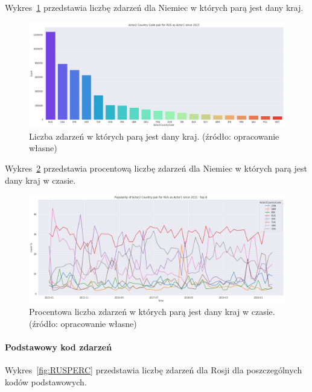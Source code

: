 \documentclass[11pt]{report}
\begin{document}
    Wykres~\ref{fig:RUSpair} przedstawia liczbę zdarzeń dla Niemiec w których parą jest dany kraj.

    \begin{figure}[!htp]
        \centering
        \includegraphics[width=1 \textwidth]{fig/RUS/RUSactor2Pair.png}
        \caption{Liczba zdarzeń w których parą jest dany kraj. (źródło: opracowanie własne)}
        \label{fig:RUSpair}
    \end{figure}


    Wykres~\ref{fig:RUSpairPerc} przedstawia procentową liczbę zdarzeń dla Niemiec w których parą jest dany kraj w czasie.
    \begin{figure}[!htp]
        \centering
        \includegraphics[width=1 \textwidth]{fig/RUS/RUSactor2PairPercinTIME.png}
        \caption{Procentowa liczba zdarzeń w których parą jest dany kraj w czasie. (źródło: opracowanie własne)}
        \label{fig:RUSpairPerc}
    \end{figure}

    \paragraph{Podstawowy kod zdarzeń}

    Wykres~\ref{fig:RUSPERC} przedstawia liczbę zdarzeń dla Rosji dla poszczególnych kodów podstawowych.
\end{document}
